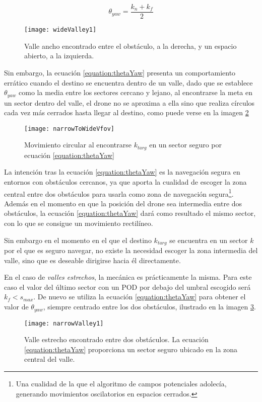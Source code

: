 \begin{equation}
\theta_{yaw} = \frac{k_n + k_f}{2}
\label{equation:thetaYaw}
\end{equation}


 \begin{figure}[H]
	\centering
	\texttt{[image: wideValley1]}
	\caption{Valle ancho encontrado entre el obstáculo, a la derecha, y un espacio abierto, a la izquierda.}\label{fig:wvalley1}
\end{figure}


Sin embargo, la ecuación \ref{equation:thetaYaw} presenta un comportamiento errático cuando el destino se encuentra dentro de un valle, dado que se establece $\theta_{yaw}$ como la media entre los sectores cercano y lejano, al encontrarse la meta en un sector dentro del valle, el drone no se aproxima a ella sino que realiza círculos cada vez más cerrados hasta llegar al destino, como puede verse en la imagen \ref{fig:nToWFOV}

 \begin{figure}[H]
	\centering
	\texttt{[image: narrowToWideVfov]}
	\caption{Movimiento circular al encontrarse $k_{targ}$ en un sector seguro por ecuación \ref{equation:thetaYaw}}\label{fig:nToWFOV}
\end{figure}

La intención tras la ecuación \ref{equation:thetaYaw} es la navegación segura en entornos con obstáculos cercanos, ya que aporta la cualidad de escoger la zona central entre dos obstáculos para usarla como zona de navegación segura\footnote{Una cualidad de la que el algoritmo de campos potenciales adolecía, generando movimientos oscilatorios en espacios cerrados.}. Además en el momento en que la posición del drone sea intermedia entre dos obstáculos, la ecuación \ref{equation:thetaYaw} dará como resultado el mismo sector, con lo que se consigue un movimiento rectilíneo. 

Sin embargo en el momento en el que el destino $k_{targ}$ se encuentra en un sector $k$ por el que es seguro navegar, no existe la necesidad escoger la zona intermedia del valle, sino que es deseable dirigirse hacia él directamente. 

\newpage
En el caso de \textit{valles estrechos}, la mecánica es prácticamente la misma. Para este caso el valor del último sector con un POD por debajo del umbral escogido será $k_f < s_{max}$. De nuevo se utiliza la ecuación \ref{equation:thetaYaw} para obtener el valor de $\theta_{yaw}$, siempre centrado entre los dos obstáculos, ilustrado en la imagen \ref{fig:nvalley1}.
 \begin{figure}[H]
	\centering
	\texttt{[image: narrowValley1]}
	\caption{Valle estrecho encontrado entre dos obstáculos. La ecuación \ref{equation:thetaYaw} proporciona un sector seguro ubicado en la zona central del valle.}\label{fig:nvalley1}
\end{figure}

